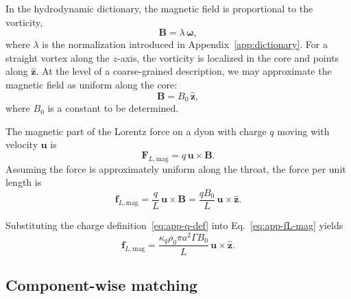 \documentclass[11pt]{article}
\begin{document}
In the hydrodynamic dictionary, the magnetic field is proportional to the vorticity,
\begin{equation}
\mathbf{B} = \lambda\,\boldsymbol{\omega},
\end{equation}
where $\lambda$ is the normalization introduced in Appendix~\ref{app:dictionary}.  For a straight vortex along the $z$-axis, the vorticity is localized in the core and points along $\hat{\mathbf{z}}$.  At the level of a coarse-grained description, we may approximate the magnetic field as uniform along the core:
\begin{equation}
\mathbf{B} = B_0\,\hat{\mathbf{z}},
\label{eq:app-B0-def}
\end{equation}
where $B_0$ is a constant to be determined.

The magnetic part of the Lorentz force on a dyon with charge $q$ moving with velocity $\mathbf{u}$ is
\begin{equation}
\mathbf{F}_{L,\mathrm{mag}}
= q\,\mathbf{u}\times\mathbf{B}.
\end{equation}
Assuming the force is approximately uniform along the throat, the force per unit length is
\begin{equation}
\mathbf{f}_{L,\mathrm{mag}}
= \frac{q}{L}\,\mathbf{u}\times\mathbf{B}
= \frac{q B_0}{L}\,\mathbf{u}\times\hat{\mathbf{z}}.
\label{eq:app-fL-mag}
\end{equation}

Substituting the charge definition~\eqref{eq:app-q-def} into Eq.~\eqref{eq:app-fL-mag} yields
\begin{equation}
\mathbf{f}_{L,\mathrm{mag}}
= \frac{\kappa_q \rho_0 \pi a^2 \Gamma B_0}{L}\,\mathbf{u}\times\hat{\mathbf{z}}.
\label{eq:app-fL-mag-expanded}
\end{equation}

\subsection{Component-wise matching}
\end{document}
